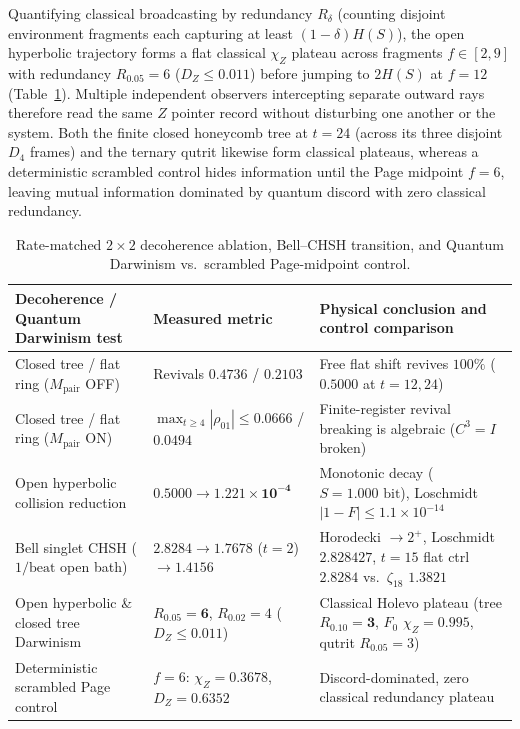 Quantifying classical broadcasting by redundancy $R_\delta$ (counting disjoint environment fragments each capturing at
least $(1 - \delta) H(S)$), the open hyperbolic trajectory forms a flat classical $\chi_Z$ plateau across fragments
$f \in [2, 9]$ with redundancy $R_{0.05} = 6$ ($D_Z \le 0.011$) before jumping to $2 H(S)$ at $f = 12$
(Table~\ref{tab:decoherence-darwinism}). Multiple independent observers intercepting separate outward rays therefore
read the same $Z$ pointer record without disturbing one another or the system. Both the finite closed honeycomb tree at
$t = 24$ (across its three disjoint $D_4$ frames) and the ternary qutrit likewise form classical plateaus, whereas a
deterministic scrambled control hides information until the Page midpoint $f = 6$, leaving mutual information dominated
by quantum discord with zero classical redundancy.

\begin{table}[tb]
\centering
\caption{Rate-matched $2 \times 2$ decoherence ablation, Bell--CHSH transition, and Quantum Darwinism vs.\ scrambled
Page-midpoint control.}
\label{tab:decoherence-darwinism}
\footnotesize
\begin{tabularx}{\textwidth}{@{}>{\raggedright\arraybackslash}p{4.30cm}>{\raggedright\arraybackslash}p{3.20cm}>{\raggedright\arraybackslash}X@{}}
\toprule
Decoherence / Quantum Darwinism test & Measured metric & Physical conclusion and control comparison \\
\midrule
Closed tree / flat ring ($M_{\mathrm{pair}}$ OFF) & Revivals $0.4736$ / $0.2103$ & Free flat shift revives $100\%$ ($0.5000$ at $t = 12, 24$) \\
Closed tree / flat ring ($M_{\mathrm{pair}}$ ON) & $\max_{t \ge 4}|\rho_{01}| \le 0.0666$ / $0.0494$ & Finite-register revival breaking is algebraic ($C^3 = I$ broken) \\
Open hyperbolic collision reduction & $0.5000 \to \mathbf{1.221 \times 10^{-4}}$ & Monotonic decay ($S = 1.000\text{ bit}$), Loschmidt $|1-F| \le 1.1 \times 10^{-14}$ \\
Bell singlet CHSH ($1/\text{beat}$ open bath) & $2.8284 \to 1.7678$ ($t{=}2$) $\to 1.4156$ & Horodecki $\to 2^+$, Loschmidt $2.828427$, $t{=}15$ flat ctrl $2.8284$ vs.\ $\zeta_{18}$ $1.3821$ \\
Open hyperbolic \& closed tree Darwinism & $R_{0.05} = \mathbf{6}$, $R_{0.02} = 4$ ($D_Z \le 0.011$) & Classical Holevo plateau (tree $R_{0.10} = \mathbf{3}$, $F_0$ $\chi_Z = 0.995$, qutrit $R_{0.05} = 3$) \\
Deterministic scrambled Page control & $f = 6$: $\chi_Z = 0.3678$, $D_Z = \mathbf{0.6352}$ & Discord-dominated, zero classical redundancy plateau \\
\bottomrule
\end{tabularx}
\end{table}

